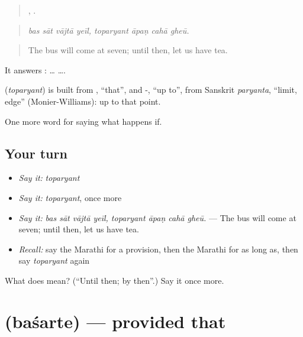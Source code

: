 \begin{quote}
   ,    .
\end{quote}

\begin{quote}
\emph{bas sāt vājtā yeīl, toparyant āpaṇ cahā gheū.}
\end{quote}

\begin{quote}
The bus will come at seven; until then, let us have tea.
\end{quote}

It answers :  …  ….

\begin{cousinweb}
\textbf{} (\emph{toparyant}) is built from , \textquotedblleft{}that\textquotedblright{}, and -, \textquotedblleft{}up to\textquotedblright{}, from Sanskrit \emph{paryanta}, \textquotedblleft{}limit, edge\textquotedblright{} (Monier-Williams): up to that point.
\end{cousinweb}

\begin{grammarlens}[title={What you've built}]
One more word for saying what happens if.
\end{grammarlens}

\subsection*{Your turn}
\begin{itemize}
\raggedright
  \item \emph{Say it:} \emph{toparyant}
  \item \emph{Say it:} \emph{toparyant}, once more
  \item \emph{Say it:} \emph{bas sāt vājtā yeīl, toparyant āpaṇ cahā gheū.} — The bus will come at seven; until then, let us have tea.
  \item \emph{Recall:} say the Marathi for a provision, then the Marathi for as long as, then say \emph{toparyant} again
\end{itemize}

\begin{tcolorbox}[breakable,colback=teal!4,colframe=teal!35!black,title={Before you move on}]
What does  mean? (\textquotedblleft{}Until then; by then\textquotedblright{}.) Say it once more.
\end{tcolorbox}
\section[\texorpdfstring{\mr{बशर्ते} (baśarte)}{बशर्ते (baśarte)}]{ (baśarte) — provided that}

